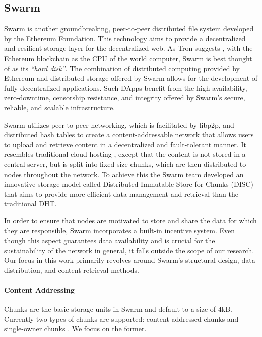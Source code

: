 \subsection{Swarm}\label{subsection:swarm}
Swarm is another groundbreaking, peer-to-peer distributed file system developed by the Ethereum Foundation. This technology aims to provide a decentralized and resilient storage layer for the decentralized web. As Tron suggests \citep{tron_2021}, with the Ethereum blockchain as the CPU of the world computer, Swarm is best thought of as its \emph{``hard disk''}. The combination of distributed computing provided by Ethereum and distributed storage offered by Swarm allows for the development of fully decentralized applications. Such DApps benefit from the high availability, zero-downtime, censorship resistance, and integrity offered by Swarm's secure, reliable, and scalable infrastructure.

Swarm utilizes peer-to-peer networking, which is facilitated by libp2p, and distributed hash tables to create a content-addressable network that allows users to upload and retrieve content in a decentralized and fault-tolerant manner. It resembles traditional cloud hosting \citep{swarmwiki_2019}, except that the content is not stored in a central server, but is split into fixed-size chunks, which are then distributed to nodes throughout the network. To achieve this the Swarm team developed an innovative storage model called Distributed Immutable Store for Chunks (DISC) \citep{swarm_team_2021} that aims to provide more efficient data management and retrieval than the traditional DHT.

In order to ensure that nodes are motivated to store and share the data for which they are responsible, Swarm incorporates a built-in incentive system. Even though this aspect guarantees data availability and is crucial for the sustainability of the network in general, it falls outside the scope of our research. Our focus in this work primarily revolves around Swarm's structural design, data distribution, and content retrieval methods.

\paragraph{Content Addressing}\label{par:chunks_swarm}

Chunks are the basic storage units in Swarm and default to a size of 4kB. Currently two types of chunks are supported: content-addressed chunks and single-owner chunks \citep{swarm_team_2021}. We focus on the former.

